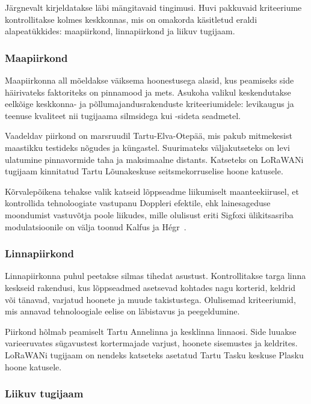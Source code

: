 \documentclass[12pt]{article}
\begin{document}
Järgnevalt kirjeldatakse läbi mängitavaid tingimusi.
Huvi pakkuvaid kriteeriume kontrollitakse kolmes keskkonnas, mis on omakorda käsitletud eraldi alapeatükkides: maapiirkond, linnapiirkond ja liikuv tugijaam.

\subsubsection{Maapiirkond}

Maapiirkonna all mõeldakse väiksema hoonestusega alasid, kus peamiseks side häirivateks faktoriteks on pinnamood ja mets.
Asukoha valikul keskendutakse eelkõige keskkonna- ja põllumajandusrakenduste kriteeriumidele: levikaugus ja teenuse kvaliteet nii tugijaama silmsidega kui -sideta seadmetel.

Vaadeldav piirkond on marsruudil Tartu-Elva-Otepää, mis pakub mitmekesist maastikku testideks nõgudes ja küngastel.
Suurimateks väljakutseteks on levi ulatumine pinnavormide taha ja maksimaalne distants.
Katseteks on LoRaWANi tugijaam kinnitatud Tartu Lõunakeskuse seitsmekorruselise hoone katusele.

Kõrvalepõikena tehakse valik katseid lõppseadme liikumiselt maanteekiirusel, et kontrollida tehnoloogiate vastupanu Doppleri efektile, ehk lainesageduse moondumist vastuvõtja poole liikudes, mille olulisust eriti Sigfoxi ülikitsasriba modulatsioonile on välja toonud Kalfus ja Hégr~\cite{kalfus2016ultra}.

\subsubsection{Linnapiirkond}

Linnapiirkonna puhul peetakse silmas tihedat asustust.
Kontrollitakse targa linna keskseid rakendusi, kus lõppseadmed asetsevad kohtades nagu korterid, keldrid või tänavad, varjatud hoonete ja muude takistustega.
Olulisemad kriteeriumid, mis annavad tehnoloogiale eelise on läbistavus ja peegeldumine.

Piirkond hõlmab peamiselt Tartu Annelinna ja kesklinna linnaosi.
Side luuakse varieeruvates sügavustest kortermajade varjust, hoonete sisemustes ja keldrites.
LoRaWANi tugijaam on nendeks katseteks asetatud Tartu Tasku keskuse Plasku hoone katusele.

\subsubsection{Liikuv tugijaam}
\end{document}
